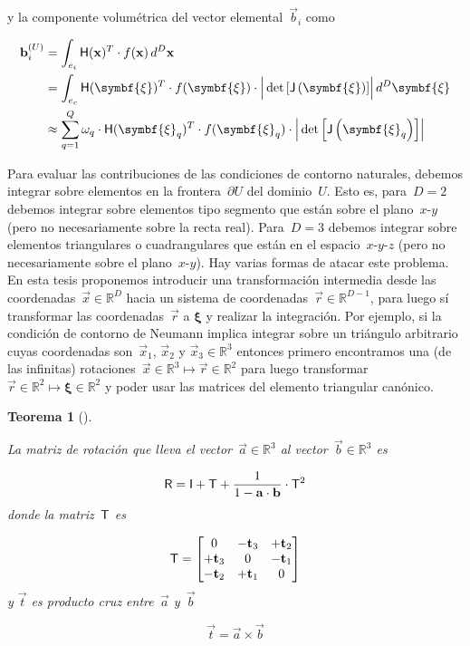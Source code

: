 \documentclass[
  12pt,
  a4paper,
  table]{scrbook}
\theoremstyle{plain}
\theoremstyle{definition}
\theoremstyle{plain}
\newtheorem{theorem}{Teorema}[chapter]
\theoremstyle{plain}
\theoremstyle{remark}
\begin{document}
y la componente volumétrica del vector elemental~\(\vec{b}_i\) como

\[
\begin{aligned}
\vec{b}_i^{(U)} &= \int_{e_i} \mat{H}(\vec{x})^T \cdot f(\vec{x}) \, d^D\vec{x} \\
&= \int_{e_c} \mat{H}(\symbf{\xi})^T \cdot f(\symbf{\xi}) \cdot \Big|\det{\left[\mat{J}\left(\symbf{\xi}\right)\right]}\Big| \, d^D\symbf{\xi} \\
&\approx
\sum_{q=1}^Q \omega_q \cdot \mat{H}(\symbf{\xi}_q)^T \cdot f(\symbf{\xi}_q) \cdot \Big|\det{\left[\mat{J}\left(\symbf{\xi}_q\right)\right]}\Big| 
\end{aligned}
\]

Para evaluar las contribuciones de las condiciones de contorno
naturales, debemos integrar sobre elementos en la
frontera~\(\partial U\) del dominio~\(U\). Esto es, para~\(D=2\) debemos
integrar sobre elementos tipo segmento que están sobre el
plano~\(x\)-\(y\) (pero no necesariamente sobre la recta real).
Para~\(D=3\) debemos integrar sobre elementos triangulares o
cuadrangulares que están en el espacio~\(x\)-\(y\)-\(z\) (pero no
necesariamente sobre el plano~\(x\)-\(y\)). Hay varias formas de atacar
este problema. En esta tesis proponemos introducir una transformación
intermedia desde las coordenadas~\(\vec{x} \in \mathbb{R}^D\) hacia un
sistema de coordenadas~\(\vec{r} \in \mathbb{R}^{D-1}\), para luego sí
transformar las coordenadas~\(\vec{r}\) a \(\symbf{\xi}\) y realizar la
integración. Por ejemplo, si la condición de contorno de Neumann implica
integrar sobre un triángulo arbitrario cuyas coordenadas
son~\(\vec{x}_1\), \(\vec{x}_2\) y \(\vec{x}_3 \in \mathbb{R}^3\)
entonces primero encontramos una (de las infinitas)
rotaciones~\(\vec{x} \in \mathbb{R}^3 \mapsto \vec{r} \in \mathbb{R}^{2}\)
para luego
transformar~\(\vec{r} \in \mathbb{R}^{2} \mapsto \symbf{\xi} \in \mathbb{R}^{2}\)
y poder usar las matrices del elemento triangular canónico.

\begin{theorem}[]\protect\hypertarget{thm-rotacion}{}\label{thm-rotacion}

La matriz de rotación que lleva el vector~\(\vec{a} \in \mathbb{R}^3\)
al vector~\(\vec{b} \in \mathbb{R}^3\) es

\[
\mathsf{R} = \mathsf{I} + \mathsf{T} + \frac{1}{1 - \mathbf{a} \cdot \mathbf{b}} \cdot \mathsf{T}^2
\] donde la matriz~\(\mathsf{T}\) es

\[
\mathsf{T} = 
\begin{bmatrix}
0 & -\mathbf{t}_3 & +\mathbf{t}_2 \\
+\mathbf{t}_3 & 0 & -\mathbf{t}_1 \\
-\mathbf{t}_2 & +\mathbf{t}_1 & 0
\end{bmatrix}
\] y \(\vec{t}\) es producto cruz entre~\(\vec{a}\) y~\(\vec{b}\)

\[
\vec{t} = \vec{a} \times \vec{b}
\]

\end{theorem}
\end{document}
